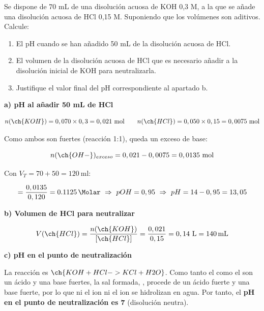 \begin{exerciseEVAU}

Se dispone de 70 mL de una disolución acuosa de KOH 0,3 M, a la que se añade una disolución acuosa
de HCl 0,15 M. Suponiendo que los volúmenes son aditivos. Calcule:
    \begin{enumerate}[label=\letraminuscula]
        \item El pH cuando se han añadido 50 mL de la disolución acuosa de HCl.
        \item El volumen de la disolución acuosa de HCl que es necesario añadir a la disolución inicial de KOH para neutralizarla.
        \item Justifique el valor final del pH correspondiente al apartado b.
    \end{enumerate}

    \begin{solu}

        \textbf{a) pH al añadir 50 mL de HCl}

        \begin{equation*}
            n(\ch{KOH}) = 0,070 \times 0,3 = 0,021 \ \text{mol} \qquad n(\ch{HCl}) = 0,050 \times 0,15 = 0,0075 \ \text{mol}
        \end{equation*}

        Como ambos son fuertes (reacción 1:1), queda un exceso de base:

        \begin{equation*}
            n(\ch{OH-})_{exceso} = 0,021 - 0,0075 = 0,0135 \ \text{mol}
        \end{equation*}

        Con \(V_T = 70+50 = \SI{120}{\milli\litre}\):

        \begin{equation*}
            [\ch{OH-}] = \dfrac{0,0135}{0,120} = \SI{0.1125}{\Molar} \ \Rightarrow \ pOH = 0,95 \ \Rightarrow \ pH = 14 - 0,95 = 13,05
        \end{equation*}

        \textbf{b) Volumen de HCl para neutralizar}

        \begin{equation*}
            V(\ch{HCl}) = \dfrac{n(\ch{KOH})}{[\ch{HCl}]} = \dfrac{0,021}{0,15} = 0,14 \ \si{\litre} = \SI{140}{\milli\litre}
        \end{equation*}

        \textbf{c) pH en el punto de neutralización}

        La reacción es \(\ch{KOH + HCl -> KCl + H2O}\). Como tanto el  como el  son un ácido y una base fuertes, la sal formada, , procede de un ácido fuerte y una base fuerte, por lo que ni el ion  ni el ion  se hidrolizan en agua. Por tanto, el \textbf{pH en el punto de neutralización es 7} (disolución neutra).

    \end{solu}
\end{exerciseEVAU}

